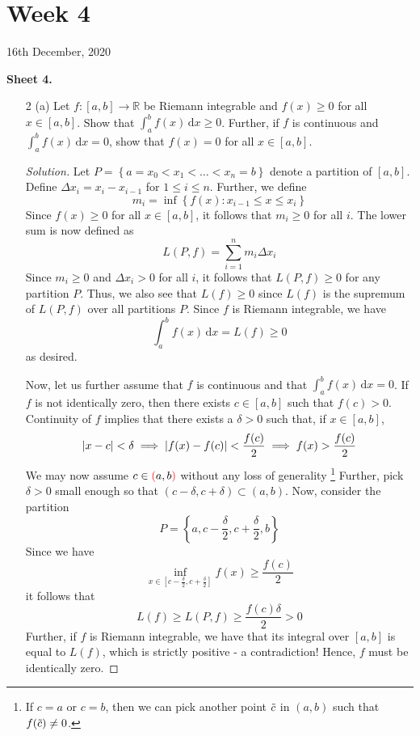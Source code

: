 \documentclass[12pt]{article}
\def\D{\mathrm{d}}
\theoremstyle{definition}
\newenvironment{soln}{\begin{proof}[Solution]}{\end{proof}}
\begin{document}
\newpage\section{Week 4}
\begin{center}
	16th December, 2020
\end{center}
\textbf{Sheet 4.}

\begin{enumerate}[leftmargin=*]
    \itemsep0.5em
    \item[2 (a)] Let $f \colon [a,b] \to \mathbb{R}$ be Riemann integrable and $f(x) \geq 0$ for all $x \in [a,b]$. Show that $\displaystyle\int_a^b f(x) \, \D x \geq 0$. Further, if $f$ is continuous and $\displaystyle\int_a^b f(x) \, \D x = 0$, show that $f(x) = 0$ for all $x \in [a,b]$.
    
    \begin{soln}
        Let $P = \left\{ a=x_0 <  x_1 < \ldots < x_n = b \right\}$ denote a partition of $[a,b]$. Define $\Delta x_i = x_i - x_{i-1}$ for $1 \leq i \leq n$. Further, we define
        \[
            m_i = \inf \left\{ f(x) \colon x_{i-1} \leq x \leq x_i \right\}
        \]
        Since $f(x) \geq 0$ for all $x \in [a,b]$, it follows that $m_i \geq 0$ for all $i$. The lower sum is now defined as
        \[
            L(P,f) = \sum_{i=1}^{n} m_i \Delta x_i
        \]
        Since $m_i \geq 0$ and $\Delta x_i > 0$ for all $i$, it follows that $L(P, f) \geq 0$ for any partition $P$. Thus, we also see that $L(f) \geq 0$ since $L(f)$ is the supremum of $L(P,f)$ over all partitions $P$. Since $f$ is Riemann integrable, we have
        \[
            \int_a^b f(x) \, \D x = L(f) \geq 0
        \]
        as desired. 
        
        \medskip
        
        Now, let us further assume that $f$ is continuous and that $\int_a^b f(x) \, \D x = 0$. If $f$ is not identically zero, then there exists $c \in [a,b]$ such that $f(c) > 0$. Continuity of $f$ implies that there exists a $\delta > 0$ such that, if $x \in [a,b]$, 
        \[
            \abs{x-c} < \delta \implies \abs{f(x) - f(c)} < \frac{f(c)}{2} \implies f(x) > \frac{f(c)}{2}
        \]
        We may now assume $c \in {\color{red}(}a,b{\color{red})}$ without any loss of generality \footnote{If $c=a$ or $c=b$, then we can pick another point $\Tilde{c}$ in $(a,b)$ such that $f(\Tilde{c}) \neq 0$.} Further, pick $\delta > 0$ small enough so that $(c-\delta, c+\delta) \subset (a,b)$. Now, consider the partition
        \[
            P = \left\{ a, c-\frac{\delta}{2}, c+\frac{\delta}{2}, b \right\}
        \]
        Since we have
        \[
            \inf\limits_{x \in [c-\frac{\delta}{2}, c+\frac{\delta}{2}]} f(x) \geq \frac{f(c)}{2}
        \]
        it follows that
        \[
            L(f) \geq L(P,f) \geq \frac{f(c) \delta}{2} > 0
        \]
        Further, if $f$ is Riemann integrable, we have that its integral over $[a,b]$ is equal to $L(f)$, which is strictly positive - a contradiction! Hence, $f$ must be identically zero.
    \end{soln}
    

\end{enumerate}
\end{document}
